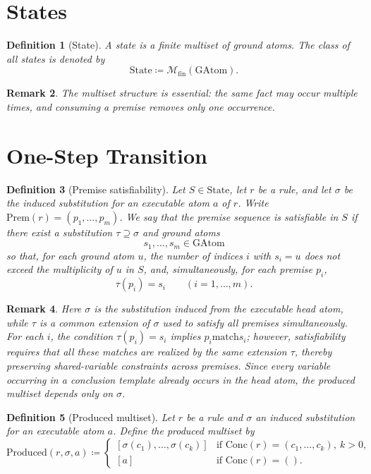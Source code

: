 \documentclass[11pt]{article}
\newtheorem{definition}{Definition}[section]
\newtheorem{remark}[definition]{Remark}
\newcommand{\GAtom}{\mathrm{GAtom}}
\newcommand{\State}{\mathrm{State}}
\newcommand{\Prem}{\mathrm{Prem}}
\newcommand{\Conc}{\mathrm{Conc}}
\newcommand{\matchrel}{\mathrel{\mathrm{match}}}
\newcommand{\powfin}{\mathcal{M}_{\mathrm{fin}}}
\newcommand{\Produced}{\mathrm{Produced}}
\begin{document}
\section{States}

\begin{definition}[State]
A state is a finite multiset of ground atoms.
The class of all states is denoted by
\[
\State \coloneqq \powfin(\GAtom).
\]
\end{definition}

\begin{remark}
The multiset structure is essential: the same fact may occur multiple times, and consuming a premise removes only one occurrence.
\end{remark}

\section{One-Step Transition}

\begin{definition}[Premise satisfiability]
Let $S \in \State$, let $r$ be a rule, and let $\sigma$ be the induced substitution for an executable atom $a$ of $r$.
Write $\Prem(r)=(p_1,\dots,p_m)$.
We say that the premise sequence is \emph{satisfiable in $S$} if there exist a substitution $\tau \supseteq \sigma$ and ground atoms
\[
s_1,\dots,s_m \in \GAtom
\]
so that, for each ground atom $u$, the number of indices $i$ with $s_i=u$ does not exceed the multiplicity of $u$ in $S$, and, simultaneously, for each premise $p_i$,
\[
\tau(p_i)=s_i \qquad (i=1,\dots,m).
\]
\end{definition}

\begin{remark}
Here $\sigma$ is the substitution induced from the executable head atom, while $\tau$ is a common extension of $\sigma$ used to satisfy all premises simultaneously.
For each $i$, the condition $\tau(p_i)=s_i$ implies $p_i \matchrel s_i$; however, satisfiability requires that all these matches are realized by the \emph{same} extension $\tau$, thereby preserving shared-variable constraints across premises.
Since every variable occurring in a conclusion template already occurs in the head atom, the produced multiset depends only on $\sigma$.
\end{remark}

\begin{definition}[Produced multiset]
Let $r$ be a rule and $\sigma$ an induced substitution for an executable atom $a$.
Define the produced multiset by
\[
\Produced(r,\sigma,a) \coloneqq
\begin{cases}
[\sigma(c_1),\dots,\sigma(c_k)] & \text{if } \Conc(r)=(c_1,\dots,c_k),\ k>0,\\
[a] & \text{if } \Conc(r)=().
\end{cases}
\]
\end{definition}
\end{document}
